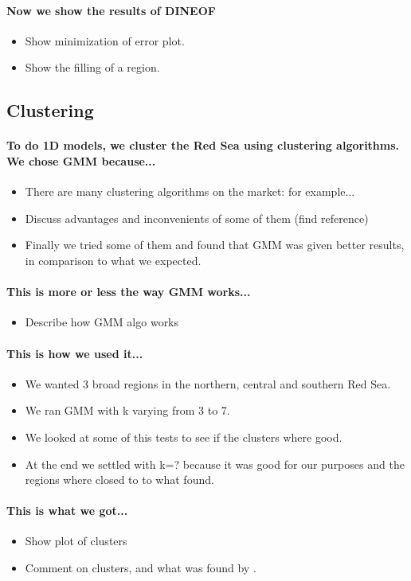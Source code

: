\paragraph{Now we show the results of DINEOF}

\begin{itemize}
  \item Show minimization of error plot.
  \item Show the filling of a region.
\end{itemize}

\subsection{Clustering}

\paragraph{To do 1D models, we cluster the Red Sea using clustering
algorithms. We chose GMM because...}

\begin{itemize}
  \item There are many clustering algorithms on the market: for example...
  \item Discuss advantages and inconvenients of some of them (find reference)
  \item Finally we tried some of them and found that GMM was given better
results, in comparison to what we expected.
\end{itemize}

\paragraph{This is more or less the way GMM works...}

\begin{itemize}
  \item Describe how GMM algo works
\end{itemize}

\paragraph{This is how we used it...}

\begin{itemize}
  \item We wanted 3 broad regions in the northern, central and southern Red Sea.
  \item We ran GMM with k varying from 3 to 7.
  \item We looked at some of this tests to see if the clusters where good.
  \item At the end we settled with k=? because it was good for our purposes and
the regions where closed to to what \citet{Raitsos2013} found.
\end{itemize}

\paragraph{This is what we got...}

\begin{itemize}
  \item Show plot of clusters
  \item Comment on clusters, and what was found by \citet{Raitsos2013}.
\end{itemize}
